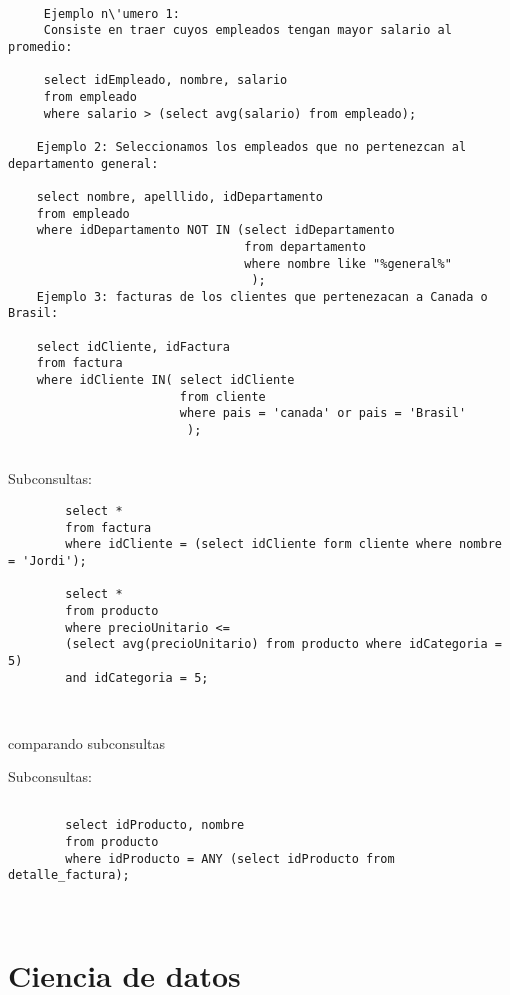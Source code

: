 \begin{ejemplo}
	\begin{verbatim}
		
	 Ejemplo n\'umero 1: 
	 Consiste en traer cuyos empleados tengan mayor salario al promedio: 
	 
	 select idEmpleado, nombre, salario
	 from empleado
	 where salario > (select avg(salario) from empleado);

	Ejemplo 2: Seleccionamos los empleados que no pertenezcan al departamento general: 
	
	select nombre, apelllido, idDepartamento
	from empleado
	where idDepartamento NOT IN (select idDepartamento 
	                             from departamento
	                             where nombre like "%general%"
	                              );
	Ejemplo 3: facturas de los clientes que pertenezacan a Canada o Brasil:
	
	select idCliente, idFactura
	from factura
	where idCliente IN( select idCliente 
						from cliente
						where pais = 'canada' or pais = 'Brasil'
						 );
	
	\end{verbatim}
\end{ejemplo}


Subconsultas: 

\begin{ejemplo}
	\begin{verbatim}
		select *
		from factura
		where idCliente = (select idCliente form cliente where nombre = 'Jordi');
		
		select *
		from producto 
		where precioUnitario <= 
		(select avg(precioUnitario) from producto where idCategoria = 5)
		and idCategoria = 5;
		
		
	\end{verbatim}
\end{ejemplo}

comparando subconsultas

Subconsultas: 

\begin{ejemplo}
	\begin{verbatim}
		
		select idProducto, nombre
		from producto
		where idProducto = ANY (select idProducto from detalle_factura);
		
		
	\end{verbatim}
\end{ejemplo}

\part{Ciencia de datos}


